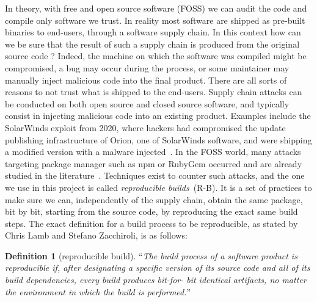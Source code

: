 \documentclass[a4paper,11pt,oneside]{report}
\theoremstyle{definition}
\newtheorem{definition}{Definition}[section]
\newcommand{\rb}{reproducible builds\xspace}
\begin{document}
In theory, with free and open source software (FOSS) we can audit the code and
compile only software we trust. In reality most software are shipped as
pre-built binaries to end-users, through a software supply chain. In this
context how can we be sure that the result of such a supply chain is produced
from the original source code ? Indeed, the machine on which the software was
compiled might be compromised, a bug may occur during the process, or some
maintainer may manually inject malicious code into the final
product. There are all sorts of reasons to not trust what is shipped to the
end-users. Supply chain attacks can be conducted on both open source and closed
source software, and typically consist in injecting malicious code into an
existing product. Examples include the SolarWinds exploit from 2020, where
hackers had compromised the update publishing infrastructure of Orion, one of
SolarWinds software, and were shipping a modified version with a malware
injected~\cite{enwiki:solarwinds}. In the FOSS world, many attacks targeting
package manager such as npm or RubyGem occurred and are already studied in the
literature~\cite{10.1007/978-3-030-52683-2_2}.
Techniques exist to counter such attacks, and the one we use in this project is
called \emph{\rb}~(R-B). It is a set of practices to make sure we can, independently of
the supply chain, obtain the same package, bit by bit, starting from the source
code, by reproducing the exact same build steps. The exact definition for a
build process to be reproducible, as stated by Chris Lamb and Stefano Zacchiroli, is
as follows:

\begin{definition}[reproducible build]
\label{def:reprobuild}
``\emph{The build process of a software
product is reproducible if, after designating a
specific version of its source code and all of its
build dependencies, every build produces bit-for-
bit identical artifacts, no matter the environment
in which the build is performed.}''~\cite{DBLP:journals/corr/abs-2104-06020}
\end{definition}
\end{document}
